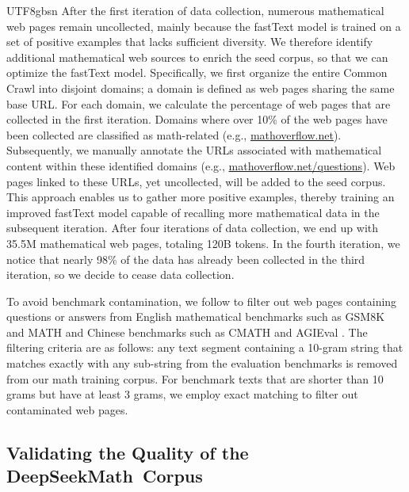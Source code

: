 \documentclass[11pt, a4paper, logo, copyright, nonumbering]{deepseek}
\newcommand{\spmath}{DeepSeekMath}
\begin{document}
\begin{CJK*}{UTF8}{gbsn}
After the first iteration of data collection, numerous mathematical web pages remain uncollected, mainly because the fastText model is trained on a set of positive examples that lacks sufficient diversity.
We therefore identify additional mathematical web sources to enrich the seed corpus, so that we can optimize the fastText model.
Specifically, we first organize the entire Common Crawl into disjoint domains;
a domain is defined as web pages sharing the same base URL.
For each domain, we calculate the percentage of web pages that are collected in the first iteration.
Domains where over 10\% of the web pages have been collected are classified as math-related (e.g., \url{mathoverflow.net}).
Subsequently, we manually annotate the URLs associated with mathematical content within these identified domains (e.g., \url{mathoverflow.net/questions}).
Web pages linked to these URLs, yet uncollected, will be added to the seed corpus.
This approach enables us to gather more positive examples, thereby training an improved fastText model capable of recalling more mathematical data in the subsequent iteration.
After four iterations of data collection, we end up with 35.5M mathematical web pages, totaling 120B tokens.
In the fourth iteration, we notice that nearly 98\% of the data has already been collected in the third iteration, so we decide to cease data collection.

To avoid benchmark contamination, we follow \cite{deepseek-coder} to filter out web pages containing questions or answers from English mathematical benchmarks such as GSM8K \citep{gsm8k} and MATH \citep{MATH} and Chinese benchmarks such as CMATH \citep{wei2023cmath} and AGIEval \citep{agieval}.
The filtering criteria are as follows: any text segment containing a 10-gram string that matches exactly with any sub-string from the evaluation benchmarks is removed from our math training corpus.
For benchmark texts that are shorter than 10 grams but have at least 3 grams, we employ exact matching to filter out contaminated web pages.

\subsection{Validating the Quality of the \spmath~Corpus}




\end{CJK*}
\end{document}
